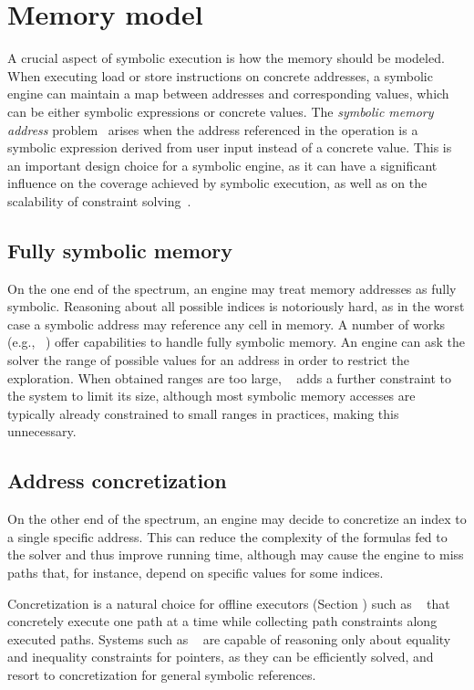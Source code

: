 
\section{Memory model}
\label{memory-model}

A crucial aspect of symbolic execution is how the memory should be modeled. When executing load or store instructions on concrete addresses, a symbolic engine can maintain a map between addresses and corresponding values, which can be either symbolic expressions or concrete values. The {\em symbolic memory address} problem~\cite{SAB-SP10} arises when the address referenced in the operation is a symbolic expression derived from user input instead of a concrete value. This is an important design choice for a symbolic engine, as it can have a significant influence on the coverage achieved by symbolic execution, as well as on the scalability of constraint solving~\cite{CS-CACM13}.

\subsection{Fully symbolic memory}
On the one end of the spectrum, an engine may treat memory addresses as fully symbolic. Reasoning about all possible indices is notoriously hard, as in the worst case a symbolic address may reference any cell in memory. A number of works (e.g., ~\cite{BITBLAZE-ICISS08,TLL-CAV10,BAP-CAV11,TS-ATVA14}) offer capabilities to handle fully symbolic memory. An engine can ask the solver the range of possible values for an address in order to restrict the exploration.  When obtained ranges are too large, ~\cite{BITBLAZE-ICISS08} adds a further constraint to the system to limit its size, although most symbolic memory accesses are typically already constrained to small ranges in practices, making this unnecessary.

\subsection{Address concretization}
On the other end of the spectrum, an engine may decide to concretize an index to a single specific address. This can reduce the complexity of the formulas fed to the solver and thus improve running time, although may cause the engine to miss paths that, for instance, depend on specific values for some indices. 

Concretization is a natural choice for offline executors (Section \missing) such as ~\cite{DART-PLDI05,SAGE-NDSS08} that concretely execute one path at a time while collecting path constraints along executed paths. Systems such as ~\cite{CREST-ASE08,CUTE-FSE13} are capable of reasoning only about equality and inequality constraints for pointers, as they can be efficiently solved, and resort to concretization for general symbolic references.


